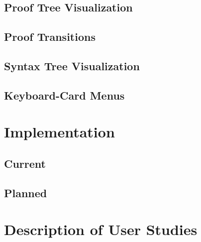 \documentclass[11pt]{amsart}
\begin{document}
\subsection{Proof Tree Visualization}

\subsection{Proof Transitions}

\subsection{Syntax Tree Visualization}

\subsection{Keyboard-Card Menus}

\section{Implementation}

\subsection{Current}

\subsection{Planned}


\section{Description of User Studies}
\end{document}
